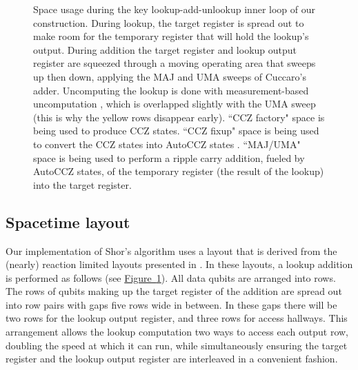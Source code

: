 \documentclass[a4paper, onecolumn, accepted=2021-03-29]{quantumarticle}
\newcommand{\fig}[1]{\hyperref[fig:#1]{Figure~\ref*{fig:#1}}}
\begin{document}
\begin{figure}
    \begin{center}
    \end{center}
    \caption{
        Space usage during the key lookup-add-unlookup inner loop of our construction.
        During lookup, the target register is spread out to make room for the temporary register that will hold the lookup's output.
        During addition the target register and lookup output register are squeezed through a moving operating area that sweeps up then down, applying the MAJ and UMA sweeps of Cuccaro's adder.
        Uncomputing the lookup is done with measurement-based uncomputation \cite{berry2019qubitization}, which is overlapped slightly with the UMA sweep (this is why the yellow rows disappear early).
        ``CCZ factory" space is being used to produce CCZ states.
        ``CCZ fixup" space is being used to convert the CCZ states into AutoCCZ states \cite{gidney2019autoccz}.
        ``MAJ/UMA" space is being used to perform a ripple carry addition, fueled by AutoCCZ states, of the temporary register (the result of the lookup) into the target register.
    }
    \label{fig:time-bars}
\end{figure}

\subsection{Spacetime layout}

Our implementation of Shor's algorithm uses a layout that is derived from the (nearly) reaction limited layouts presented in \cite{gidney2019autoccz}.
In these layouts, a lookup addition is performed as follows (see \fig{time-bars}).
All data qubits are arranged into rows.
The rows of qubits making up the target register of the addition are spread out into row pairs with gaps five rows wide in between.
In these gaps there will be two rows for the lookup output register, and three rows for access hallways.
This arrangement allows the lookup computation two ways to access each output row, doubling the speed at which it can run, while simultaneously ensuring the target register and the lookup output register are interleaved in a convenient fashion.
\end{document}

